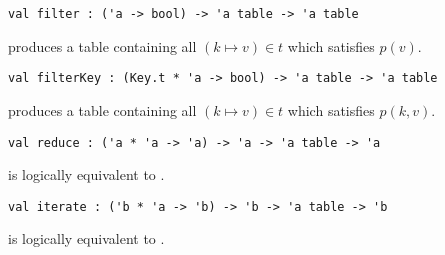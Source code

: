 \begin{cluster}
\label{grp:grm:table-interface::filter}

\begin{gram}[filter]
\label{grm:table-interface::filter}
\begin{verbatim}
val filter : ('a -> bool) -> 'a table -> 'a table
\end{verbatim}
 produces a table containing all $(k \mapsto v) \in t$ which
satisfies $p(v)$.

\end{gram}
\end{cluster}

\begin{cluster}
\label{grp:grm:table-interface::filterkey}

\begin{gram}[filterKey]
\label{grm:table-interface::filterkey}
\begin{verbatim}
val filterKey : (Key.t * 'a -> bool) -> 'a table -> 'a table
\end{verbatim}
 produces a table containing all $(k \mapsto v) \in t$ which
satisfies $p(k,v)$.

\end{gram}
\end{cluster}

\begin{cluster}
\label{grp:grm:table-interface::reduce}

\begin{gram}[reduce]
\label{grm:table-interface::reduce}
\begin{verbatim}
val reduce : ('a * 'a -> 'a) -> 'a -> 'a table -> 'a
\end{verbatim}
 is logically equivalent to .

\end{gram}
\end{cluster}

\begin{cluster}
\label{grp:grm:table-interface::iterate}

\begin{gram}[iterate]
\label{grm:table-interface::iterate}
\begin{verbatim}
val iterate : ('b * 'a -> 'b) -> 'b -> 'a table -> 'b
\end{verbatim}
 is logically equivalent to .

\end{gram}
\end{cluster}

